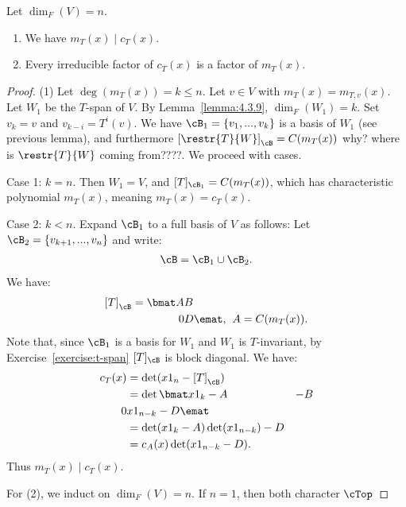     \begin{theorem}
        Let $\dim_F(V) = n$.
        \begin{enumerate}[label = (\arabic*)]
            \item We have $m_T(x) \mid c_T(x)$.
            \item Every irreducible factor of $c_T(x)$ is a factor of $m_T(x)$.
        \end{enumerate}
    \end{theorem}
        \begin{proof}
            (1) Let $\deg(m_T(x)) = k \leq n$. Let $v \in V$ with $m_T(x) = m_{T,v}(x)$. Let $W_1$ be the $T$-span of $V$. By Lemma~\ref{lemma:4.3.9}, $\dim_F(W_1) = k$. Set $v_k = v$ and $v_{k-i} = T^i(v)$. We have $\cB_1 = \{v_1,...,v_k\}$ is a basis of $W_1$ (see previous lemma), and furthermore $\left[\restr{T}{W}\right]_\cB = C(m_T(x))$ {\color{red} why? where is $\restr{T}{W}$ coming from????}. We proceed with cases.

            Case 1: $k = n$. Then $W_1 = V$, and $[T]_{\cB_1} = C(m_T(x))$, which has characteristic polynomial $m_T(x)$, meaning $m_T(x) = c_T(x)$.

            Case 2: $k < n$. Expand $\cB_1$ to a full basis of $V$ as follows: Let $\cB_2 = \{v_{k+1},...,v_n\}$ and write:
                \begin{equation*}
                \begin{split}
                    \cB = \cB_1 \cup \cB_2.
                \end{split}
                \end{equation*}
            We have:
                \begin{equation*}
                \begin{split}
                    \left[T\right]_\cB = \bmat A & B \\ 0 & D \emat, \hspace{4pt} A = C(m_T(x)).
                \end{split}
                \end{equation*}
            Note that, since $\cB_1$ is a basis for $W_1$ and $W_1$ is $T$-invariant, by Exercise~\ref{exercise:t-span} $[T]_\cB$ is block diagonal. We have:
                \begin{equation*}
                \begin{split}
                    c_T(x)
                    & = \det(x1_n - \left[T\right]_\cB) \\
                    & = \det \bmat x1_k - A & -B \\ 0 & x1_{n-k}-D \emat \\
                    & = \det(x1_k - A)\det(x1_{n-k})-D \\
                    & = c_A(x)\det(x1_{n-k}-D).
                \end{split}
                \end{equation*}
            Thus $m_T(x) \mid c_T(x)$.

            For (2), we induct on $\dim_F(V) = n$. If $n = 1$, then both character $\cTop$
        \end{proof}
    

    


